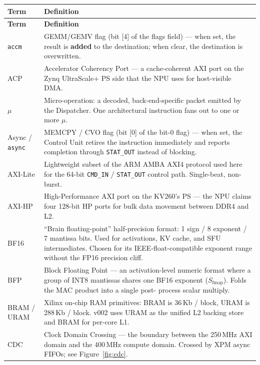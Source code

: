 \documentclass[11pt,a4paper,twoside,openany]{report}
\providecommand{\uop}{\ensuremath{\mu}\text{op}\xspace}
\providecommand{\uops}{\ensuremath{\mu}\text{ops}\xspace}
\begin{document}
\begin{longtable}{|>{\raggedright\arraybackslash}p{3.8cm}|p{11.8cm}|}
\hline
\rowcolor{skytint}
\textbf{Term} & \textbf{Definition} \\
\hline
\endfirsthead

\rowcolor{skytint}
\textbf{Term} & \textbf{Definition} \\
\hline
\endhead

\texttt{accm} & GEMM/GEMV flag (bit [4] of the flags field) --- when set,
the result is \textbf{added} to the destination; when clear, the
destination is overwritten. \\
\hline
ACP & Accelerator Coherency Port --- a cache-coherent AXI port on the
Zynq UltraScale+ PS side that the NPU uses for host-visible DMA. \\
\hline
\uop & Micro-operation: a decoded, back-end-specific packet emitted
by the Dispatcher.  One architectural instruction fans out to one or
more \uops. \\
\hline
Async / \texttt{async} & MEMCPY / CVO flag (bit [0] of the bit-0 flag)
--- when set, the Control Unit retires the instruction immediately and
reports completion through \texttt{STAT\_OUT} instead of blocking. \\
\hline
AXI-Lite & Lightweight subset of the ARM AMBA AXI4 protocol used here
for the 64-bit \texttt{CMD\_IN} / \texttt{STAT\_OUT} control path.
Single-beat, non-burst. \\
\hline
AXI-HP & High-Performance AXI port on the KV260's PS --- the NPU claims
four 128-bit HP ports for bulk data movement between DDR4 and L2. \\
\hline
BF16 & ``Brain floating-point'' half-precision format: 1 sign / 8
exponent / 7 mantissa bits.  Used for activations, KV cache, and SFU
intermediates.  Chosen for its IEEE-float-compatible exponent range
without the FP16 precision cliff. \\
\hline
BFP & Block Floating Point --- an activation-level numeric format
where a group of INT8 mantissas shares one BF16 exponent
($S_{\mathrm{fmap}}$).  Folds the MAC product into a single post-
process scalar multiply. \\
\hline
BRAM / URAM & Xilinx on-chip RAM primitives: BRAM is 36\,Kb / block,
URAM is 288\,Kb / block.  v002 uses URAM as the unified L2 backing
store and BRAM for per-core L1. \\
\hline
CDC & Clock Domain Crossing --- the boundary between the 250\,MHz
AXI domain and the 400\,MHz compute domain.  Crossed by XPM async
FIFOs; see Figure~\ref{fig:cdc}. \\

\end{longtable}
\end{document}
